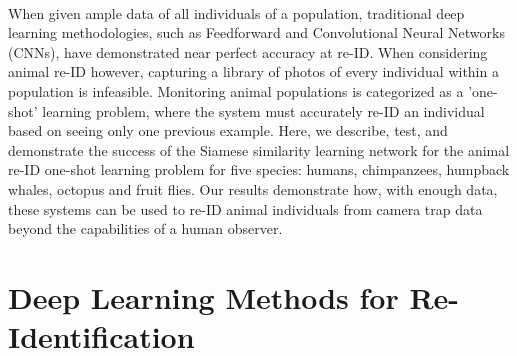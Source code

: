 \documentclass[11pt]{article}
\begin{document}
\newline
\\
When given ample data of all individuals of a population, traditional deep learning methodologies, such as Feedforward and Convolutional Neural Networks (CNNs), have demonstrated near perfect accuracy at re-ID. When considering animal re-ID however, capturing a library of photos of every individual within a population is infeasible. Monitoring animal populations is categorized as a 'one-shot' learning problem, where the system must accurately re-ID an individual based on seeing only one previous example. Here, we describe, test, and demonstrate the success of the Siamese similarity learning network for the animal re-ID one-shot learning problem for five species: humans, chimpanzees, humpback whales, octopus and fruit flies. Our results demonstrate how, with enough data, these systems can be used to re-ID animal individuals from camera trap data beyond the capabilities of a human observer. 


\section*{Deep Learning Methods for Re-Identification}
\end{document}

